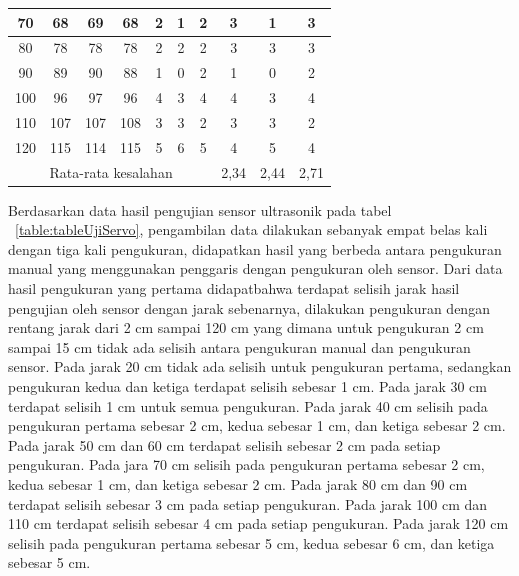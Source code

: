 \begin{atable}
\begin{tabular}{|c|c|c|c|c|c|c|c|c|c|}
    70                                 & 68            & 69           & 68           & 2             & 1             & 2            & 3            & 1            & 3           \\ \hline
    80                                 & 78            & 78           & 78           & 2             & 2             & 2            & 3            & 3            & 3           \\ \hline
    90                                 & 89            & 90           & 88           & 1             & 0             & 2            & 1            & 0            & 2           \\ \hline
    100                                & 96            & 97           & 96           & 4             & 3             & 4            & 4            & 3            & 4           \\ \hline
    110                                & 107           & 107          & 108          & 3             & 3             & 2            & 3            & 3            & 2           \\ \hline
    120                                & 115           & 114          & 115          & 5             & 6             & 5            & 4            & 5            & 4           \\ \hline
    \multicolumn{7}{|c|}{Rata-rata kesalahan}                                                                                       & 2,34         & 2,44         & 2,71        \\ \hline
    \end{tabular}
\end{atable}

Berdasarkan data hasil pengujian sensor ultrasonik pada tabel ~\ref{table:tableUjiServo}, pengambilan data dilakukan sebanyak empat belas kali dengan tiga kali pengukuran, didapatkan hasil yang berbeda antara pengukuran manual yang menggunakan penggaris dengan pengukuran oleh sensor. Dari data hasil pengukuran yang pertama didapatbahwa terdapat selisih jarak hasil pengujian oleh sensor dengan jarak sebenarnya, dilakukan pengukuran dengan rentang jarak dari 2 cm sampai 120 cm yang dimana untuk pengukuran 2 cm sampai 15 cm tidak ada selisih antara pengukuran manual dan pengukuran sensor. Pada jarak 20 cm tidak ada selisih untuk pengukuran pertama, sedangkan pengukuran kedua dan ketiga terdapat selisih sebesar 1 cm. Pada jarak 30 cm terdapat selisih 1 cm untuk semua pengukuran. Pada jarak 40 cm selisih pada pengukuran pertama sebesar 2 cm, kedua sebesar 1 cm, dan ketiga sebesar 2 cm. Pada jarak 50 cm dan 60 cm terdapat selisih sebesar 2 cm pada setiap pengukuran. Pada jara 70 cm selisih pada pengukuran pertama sebesar 2 cm, kedua sebesar 1 cm, dan ketiga sebesar 2 cm. Pada jarak 80 cm dan 90 cm terdapat selisih sebesar 3 cm pada setiap pengukuran. Pada jarak 100 cm dan 110 cm terdapat selisih sebesar 4 cm pada setiap pengukuran. Pada jarak 120 cm selisih pada pengukuran pertama sebesar 5 cm, kedua sebesar 6 cm, dan ketiga sebesar 5 cm.

